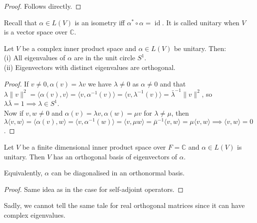 \begin{proof}
    Follows directly.
\end{proof}
Recall that $\alpha\in L(V)$ is an isometry iff $\alpha^\ast\circ\alpha=\operatorname{id}$.
It is called unitary when $V$ is a vector space over $\mathbb C$.
\begin{lemma}
    Let $V$ be a complex inner product space and $\alpha\in L(V)$ be unitary.
    Then:\\
    (i) All eigenvalues of $\alpha$ are in the unit circle $S^1$.\\
    (ii) Eigenvectors with distinct eigenvalues are orthogonal.
\end{lemma}
\begin{proof}
    If $v\neq 0,\alpha(v)=\lambda v$ we have $\lambda\neq 0$ as $\alpha\neq 0$ and that $\lambda\|v\|^2=\langle\alpha(v),v\rangle=\langle v,\alpha^{-1}(v)\rangle=\langle v, \lambda^{-1}(v)\rangle=\bar{\lambda}^{-1}\|v\|^2$, so $\lambda\bar\lambda=1\implies\lambda\in S^1$.\\
    Now if $v,w\neq 0$ and $\alpha(v)=\lambda v,\alpha(w)=\mu v$ for $\lambda\neq\mu$, then $\lambda\langle v,w\rangle=\langle\alpha(v),w\rangle=\langle v,\alpha^{-1}(w)\rangle=\langle v,\mu w\rangle=\bar{\mu}^{-1}\langle v,w\rangle=\mu\langle v,w\rangle\implies\langle v,w\rangle=0$.
\end{proof}
\begin{theorem}
    Let $V$ be a finite dimensional inner product space over $F=\mathbb C$ and $\alpha\in L(V)$ is unitary.
    Then $V$ has an orthogonal basis of eigenvectors of $\alpha$.
\end{theorem}
Equivalently, $\alpha$ can be diagonalised in an orthonormal basis.
\begin{proof}
    Same idea as in the case for self-adjoint operators.
\end{proof}
Sadly, we cannot tell the same tale for real orthogonal matrices since it can have complex eigenvalues.